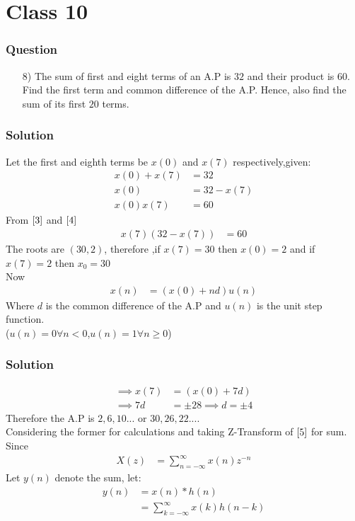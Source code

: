 \documentclass{beamer}
\providecommand{\brak}[1]{\ensuremath{\left(#1\right)}}
\theoremstyle{remark}
\begin{document}
    \section{Class 10}






\begin{frame}
\frametitle{Question }
\begin{enumerate}
    \item [8)]
The sum of first and eight terms of an A.P is $32$ and their product is $60$. Find the first term and common difference of the A.P. Hence, also find the sum of its first $20$ terms. 
\end{enumerate}
\end{frame}





\begin{frame}
\frametitle{Solution}
Let the first and eighth terms be $x\brak{0}$ and $x\brak{7}$ respectively,given:
\begin{align}
x\brak{0}+x\brak{7} &= 32\\
x\brak{0} &= 32 - x\brak{7}\label{3} \\
x\brak{0}x\brak{7} &= 60 \label{4}
\end{align}
From $\eqref{3}$ and $\eqref{4}$
\begin{align}
    x\brak{7}\brak{32-x\brak{7}} &= 60
\end{align}
The roots are $\brak{30,2}$, therefore ,if $x\brak{7}=30$ then $x\brak{0}=2$ and if $x\brak{7}=2$ then $x_0=30$\\
Now
\begin{align}
    x\brak{n} &= \brak{x\brak{0} + nd}u\brak{n}\label{5}
    \end{align}
    Where $d$ is the common difference of the A.P and $u(n)$ is the unit step function.\\($u\brak{n}=0 \forall n<0$,$u\brak{n}=1 \forall n\geq0$)
\end{frame}






\begin{frame}
\frametitle{Solution}
\begin{align}
        \implies     x\brak{7} &= \brak{x\brak{0} + 7d}\\
    \implies 7d &= \pm 28 \implies d = \pm 4
\end{align}
Therefore the A.P is $2,6,10...$ or $30,26,22...$.\\
Considering the former for calculations and taking Z-Transform of $\eqref{5}$ for sum.\\
Since
\begin{align}
X(z) &= \sum_{n=-\infty}^{\infty} x(n)z^{-n} \label{6}
\end{align}
Let $y\brak{n}$ denote the sum, let:
\begin{align}
    y\brak{n} &= x\brak{n} * h\brak{n}\\
    &= \sum_{k=-\infty}^{\infty} x(k)h(n-k)
\end{align}    
\end{frame}
\end{document}
